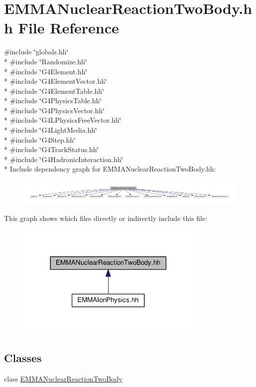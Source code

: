 \hypertarget{EMMANuclearReactionTwoBody_8hh}{}\section{E\+M\+M\+A\+Nuclear\+Reaction\+Two\+Body.\+hh File Reference}
\label{EMMANuclearReactionTwoBody_8hh}
{\ttfamily \#include \char`\"{}globals.\+hh\char`\"{}}\\*
{\ttfamily \#include \char`\"{}Randomize.\+hh\char`\"{}}\\*
{\ttfamily \#include \char`\"{}G4\+Element.\+hh\char`\"{}}\\*
{\ttfamily \#include \char`\"{}G4\+Element\+Vector.\+hh\char`\"{}}\\*
{\ttfamily \#include \char`\"{}G4\+Element\+Table.\+hh\char`\"{}}\\*
{\ttfamily \#include \char`\"{}G4\+Physics\+Table.\+hh\char`\"{}}\\*
{\ttfamily \#include \char`\"{}G4\+Physics\+Vector.\+hh\char`\"{}}\\*
{\ttfamily \#include \char`\"{}G4\+L\+Physics\+Free\+Vector.\+hh\char`\"{}}\\*
{\ttfamily \#include \char`\"{}G4\+Light\+Media.\+hh\char`\"{}}\\*
{\ttfamily \#include \char`\"{}G4\+Step.\+hh\char`\"{}}\\*
{\ttfamily \#include \char`\"{}G4\+Track\+Status.\+hh\char`\"{}}\\*
{\ttfamily \#include \char`\"{}G4\+Hadronic\+Interaction.\+hh\char`\"{}}\\*
Include dependency graph for E\+M\+M\+A\+Nuclear\+Reaction\+Two\+Body.\+hh\+:
\nopagebreak
\begin{figure}[H]
\begin{center}
\leavevmode
\includegraphics[width=350pt]{EMMANuclearReactionTwoBody_8hh__incl}
\end{center}
\end{figure}
This graph shows which files directly or indirectly include this file\+:
\nopagebreak
\begin{figure}[H]
\begin{center}
\leavevmode
\includegraphics[width=254pt]{EMMANuclearReactionTwoBody_8hh__dep__incl}
\end{center}
\end{figure}
\subsection*{Classes}
\begin{DoxyCompactItemize}
\item 
class \hyperlink{classEMMANuclearReactionTwoBody}{E\+M\+M\+A\+Nuclear\+Reaction\+Two\+Body}
\end{DoxyCompactItemize}
